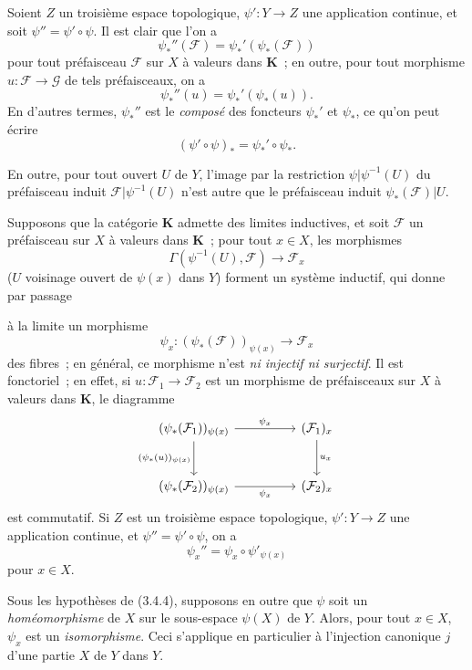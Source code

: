 \begin{env}[3.4.3]
\label{0.3.4.3-fr}
Soient $Z$ un troisième espace topologique, $\psi':Y\to Z$ une application
continue, et soit $\psi''=\psi'\circ\psi$. Il est clair que l'on a
\[
  \psi_*''(\mathcal{F})=\psi_*'(\psi_*(\mathcal{F}))
\]
pour tout préfaisceau $\mathcal{F}$ sur $X$ à valeurs dans $\boldsymbol{K}$~; en
outre, pour tout morphisme $u:\mathcal{F}\to\mathcal{G}$ de tels préfaisceaux,
on a
\[
  \psi_*''(u)=\psi_*'(\psi_*(u)).
\]
En d'autres termes, $\psi_*''$ est le \emph{composé} des foncteurs $\psi_*'$
et $\psi_*$, ce qu'on peut écrire
\[
  (\psi'\circ\psi)_*=\psi_*'\circ\psi_*.
\]

En outre, pour tout ouvert $U$ de $Y$, l'image par la restriction
$\psi|\psi^{-1}(U)$ du préfaisceau induit
$\mathcal{F}|\psi^{-1}(U)$ n'est autre que le préfaisceau induit
$\psi_*(\mathcal{F})|U$.
\end{env}

\begin{env}[3.4.4]
\label{0.3.4.4-fr}
Supposons que la catégorie $\boldsymbol{K}$ admette des limites inductives, et soit
$\mathcal{F}$ un préfaisceau sur $X$ à valeurs dans $\boldsymbol{K}$~; pour tout
$x\in X$, les morphismes
\[
  \Gamma(\psi^{-1}(U),\mathcal{F})\to\mathcal{F}_x
\]
($U$ voisinage ouvert de $\psi(x)$ dans $Y$) forment un système inductif, qui
donne par passage


à la limite un morphisme
\[
  \psi_x:(\psi_*(\mathcal{F}))_{\psi(x)}\to\mathcal{F}_x
\]
des fibres~; en général, ce morphisme n'est \emph{ni injectif ni surjectif}.
Il est fonctoriel~; en effet, si
$u:\mathcal{F}_1\to\mathcal{F}_2$ est un morphisme de préfaisceaux sur $X$ à
valeurs dans $\boldsymbol{K}$, le diagramme
\[
\begin{tikzcd}[column sep=huge,row sep=large]
(\psi_*(\mathcal{F}_1))_{\psi(x)}
  \arrow[r,"\psi_x"] \arrow[d,"{(\psi_*(u))_{\psi(x)}}"']
  & (\mathcal{F}_1)_x \arrow[d,"u_x"] \\
(\psi_*(\mathcal{F}_2))_{\psi(x)}
  \arrow[r,"\psi_x"']
  & (\mathcal{F}_2)_x
\end{tikzcd}
\]
est commutatif. Si $Z$ est un troisième espace topologique,
$\psi':Y\to Z$ une application continue, et $\psi''=\psi'\circ\psi$, on a
\[
  \psi_x''=\psi_x\circ\psi'_{\psi(x)}
\]
pour $x\in X$.
\end{env}

\begin{env}[3.4.5]
\label{0.3.4.5-fr}
Sous les hypothèses de (3.4.4), supposons en outre que $\psi$ soit un
\emph{homéomorphisme} de $X$ sur le sous-espace $\psi(X)$ de $Y$. Alors, pour
tout $x\in X$, $\psi_x$ est un \emph{isomorphisme}. Ceci s'applique en
particulier à l'injection canonique $j$ d'une partie $X$ de $Y$ dans $Y$.
\end{env}

